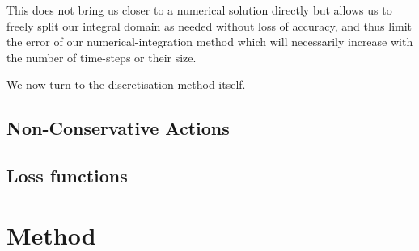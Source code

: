 \documentclass[10pt]{iopart}
\begin{document}
This does not bring us closer to a numerical solution directly but allows us to freely split our integral domain as needed without loss of accuracy, and thus limit the error of our numerical-integration method which will necessarily increase with the number of time-steps or their size.

We now turn to the discretisation method itself.


%


\subsection{Non-Conservative Actions}
\subsection{Loss functions}



\section{Method}
\end{document}
